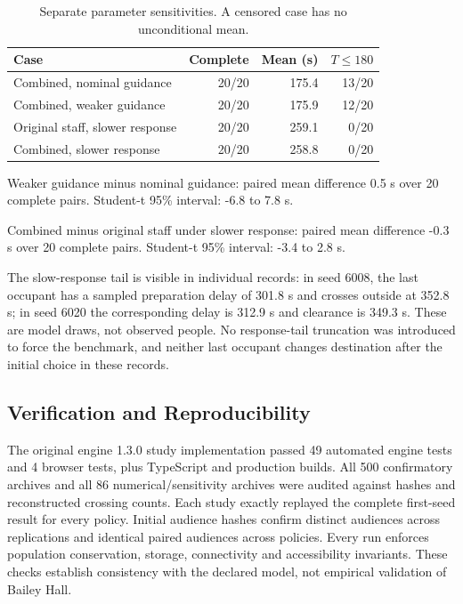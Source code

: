 \begin{table}[htbp]\centering\small

\begin{tabular}{lrrr}\toprule

Case & Complete & Mean (s) & $T\leq180$\\\midrule

Combined, nominal guidance & 20/20 & 175.4 & 13/20\\

Combined, weaker guidance & 20/20 & 175.9 & 12/20\\

Original staff, slower response & 20/20 & 259.1 & 0/20\\

Combined, slower response & 20/20 & 258.8 & 0/20\\

\bottomrule\end{tabular}\caption{Separate parameter sensitivities. A censored case has no unconditional mean.}\end{table}

Weaker guidance minus nominal guidance: paired mean difference 0.5 s over 20 complete pairs. Student-t 95\% interval: -6.8 to 7.8 s.

Combined minus original staff under slower response: paired mean difference -0.3 s over 20 complete pairs. Student-t 95\% interval: -3.4 to 2.8 s.

The slow-response tail is visible in individual records: in seed 6008, the last occupant has a sampled preparation delay of 301.8 s and crosses outside at 352.8 s; in seed 6020 the corresponding delay is 312.9 s and clearance is 349.3 s. These are model draws, not observed people. No response-tail truncation was introduced to force the benchmark, and neither last occupant changes destination after the initial choice in these records.

\subsection{Verification and Reproducibility}

The original engine 1.3.0 study implementation passed 49 automated engine tests and 4 browser tests, plus TypeScript and production builds. All 500 confirmatory archives and all 86 numerical/sensitivity archives were audited against hashes and reconstructed crossing counts. Each study exactly replayed the complete first-seed result for every policy. Initial audience hashes confirm distinct audiences across replications and identical paired audiences across policies. Every run enforces population conservation, storage, connectivity and accessibility invariants. These checks establish consistency with the declared model, not empirical validation of Bailey Hall.
